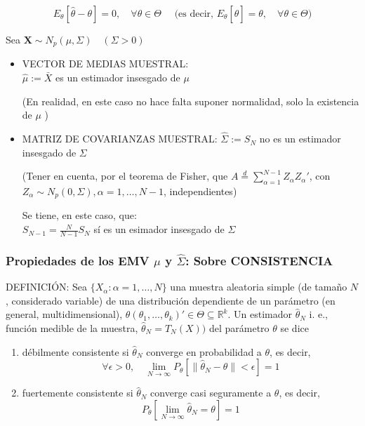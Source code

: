 \documentclass[11pt,a4paper]{article}
\begin{document}
$$E_{\theta}[\hat{\theta}-\theta]=0, \quad \forall \theta \in \Theta \quad \text { (es decir, } E_{\theta}[\hat{\theta}]=\theta, \quad \forall \theta \in \Theta)$$

Sea $\mathbf{X} \sim N_{p}(\mu, \Sigma) \quad(\Sigma>0)$

\begin{itemize}
\item VECTOR DE MEDIAS MUESTRAL: \\
$\hat{\mu}:=\bar{X}$ es un estimador insesgado de $\mu$

(En realidad, en este caso no hace falta suponer normalidad, solo la existencia de $\mu$ )

\item MATRIZ DE COVARIANZAS MUESTRAL:
$\hat{\Sigma}:=S_{N}$ no es un estimador insesgado de $\Sigma$

(Tener en cuenta, por el teorema de Fisher, que $A \stackrel{d}{=} \sum_{\alpha=1}^{N-1} Z_{\alpha} Z_{\alpha}'$, con $Z_{\alpha} \sim N_{p}(0, \Sigma), \alpha=1, \ldots, N-1$, independientes)

Se tiene, en este caso, que: \\
$S_{N-1}=\frac{N}{N-1} S_{N}$ sí es un esimador insesgado de $\Sigma$
\end{itemize}

\subsubsection{Propiedades de los EMV \texorpdfstring{$\hat{\mu}$}) y \texorpdfstring{$\hat{\Sigma}$}): Sobre CONSISTENCIA}
DEFINICIÓN: Sea $\{X_{\alpha}: \alpha=1, \ldots, N\}$ una muestra aleatoria simple (de tamaño $N$, considerado variable) de una distribución dependiente de un parámetro (en general, multidimensional), $\theta(\theta_{1}, \ldots, \theta_{k})' \in \Theta \subseteq \mathbb{R}^{k}$. Un estimador $\hat{\theta}_{N}$ i. e., función medible de la muestra, $\hat{\theta}_{N}=T_{N}(X))$ del parámetro $\theta$ se dice
\begin{enumerate}[label=(\alph*)]
\item débilmente consistente si $\hat{\theta}_{N}$ converge en probabilidad a $\theta$, es decir,
$$\forall \epsilon>0, \quad \lim\limits_{N \to \infty} P_{\theta} [\|\hat{\theta}_{N}-\theta\|<\epsilon]=1$$

\item fuertemente consistente si $\hat{\theta}_{N}$ converge casi seguramente a $\theta$, es decir,
$$P_{\theta} [\lim\limits_{N \to \infty} \hat{\theta}_{N}=\theta]=1$$
\end{enumerate}
\end{document}
